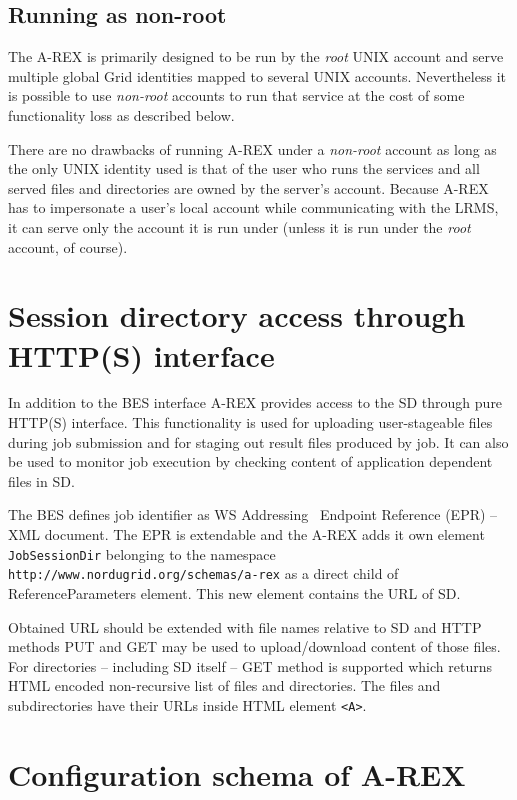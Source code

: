 \documentclass{article}                            %
\begin{document}
\subsection{Running as non-root}

The A-REX is primarily designed to be run by the \emph{root} UNIX
account and serve multiple global Grid identities mapped to several
UNIX accounts. Nevertheless it is possible to use \emph{non-root}
accounts to run that service at the cost of some functionality loss
as described below.

There are no drawbacks of running A-REX under a \emph{non-root} account
as long as the only UNIX identity used is that of the user who runs
the services and all served files and directories are owned by the
server's account. Because A-REX has to impersonate a user's local
account while communicating with the LRMS, it can serve only the account
it is run under (unless it is run under the \emph{root} account, of
course).

\appendix

\section{Session directory access through HTTP(S) interface\label{annex:a}}

In addition to the BES interface A-REX provides access to the SD through
pure HTTP(S) interface. This functionality is used for uploading user-stageable
files during job submission and for staging out result files produced
by job. It can also be used to monitor job execution by checking content
of application dependent files in SD.

The BES defines job identifier as WS Addressing~\cite{ws-addr-soap}
Endpoint Reference (EPR) -- XML document. The EPR is extendable and 
the A-REX adds it own element \texttt{JobSessionDir} belonging to the namespace
\texttt{http://www.nordugrid.org/schemas/a-rex} as a direct child of ReferenceParameters
element. This new element contains the URL of SD.

Obtained URL should be extended with file names relative to SD and
HTTP methods PUT and GET may be used to upload/download content of
those files. For directories -- including SD itself -- GET method is
supported which returns HTML encoded non-recursive list of files and
directories. The files and subdirectories have their URLs inside HTML
element \verb|<A>|.


\section{Configuration schema of A-REX\label{annex:arex-conf}}
\end{document}
